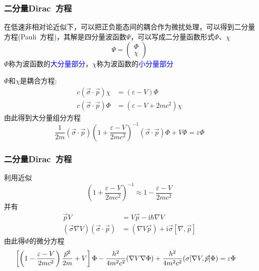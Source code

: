 \frame
{
	\frametitle{二分量\textrm{Dirac~}方程}
	在低速非相对论近似下，可以把正负能态间的耦合作为微扰处理，可以得到二分量方程(\textrm{Pauli~}方程)，其解是四分量波函数$\Psi$，可以写成二分量函数形式$\Phi$、$\chi$
	\begin{displaymath}
		\Psi=\left( 
		\begin{matrix}
			\Phi\\
			\chi
		\end{matrix}
		\right)
	\end{displaymath}
	$\Phi$称为波函数的\textcolor{blue}{大分量部分}，$\chi$称为波函数的\textcolor{blue}{小分量部分}

	$\Phi$和$\chi$是耦合方程:%
	\begin{displaymath}
		\begin{aligned}
			c(\vec{\sigma}\cdot\vec p)\chi&=(\varepsilon-V)\Phi\\
			c(\vec{\sigma}\cdot\vec p)\Phi&=(\varepsilon-V+2mc^2)\chi
		\end{aligned}
	\end{displaymath}
	由此得到大分量组分方程
	\begin{displaymath}
		\frac1{2m}(\vec{\sigma}\cdot\vec p)\left( 1+\frac{\varepsilon-V}{2mc^2} \right)^{-1}(\vec{\sigma}\cdot\vec p)\Phi+V\Phi=\varepsilon\Phi	
	\end{displaymath}
}

\frame
{
	\frametitle{二分量\textrm{Dirac~}方程}
	利用近似$$\left( 1+\frac{\varepsilon-V}{2mc^2} \right)^{-1}\approx1-\frac{\varepsilon-V}{2mc^2}$$
	并有
	\begin{displaymath}
		\begin{aligned}
			\vec pV&=V\vec p-\mathrm{i}\hbar\nabla V\\
			(\vec{\sigma}\nabla V)(\vec{\sigma}\cdot\vec p)&=(\nabla V\vec p)+\mathrm{i}\vec{\sigma}[\nabla,\vec p]
		\end{aligned}
	\end{displaymath}
	由此得$\Phi$的微分方程
	\begin{displaymath}
		\hspace*{-10pt}	\left[ \left( 1-\frac{\varepsilon-V}{2mc^2} \right)\frac{\vec p^2}{2m}+V \right]\Phi-\frac{h^2}{4m^2c^2}(\nabla V\nabla \Phi)+\frac{h^2}{4m^2c^2}(\sigma[\nabla V,\vec p]\Phi)=\varepsilon\Phi
	\end{displaymath}
}

